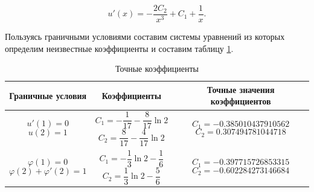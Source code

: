 \documentclass{article}
\begin{document}
\begin{displaymath}
	u'(x) = - \frac{2C_{2}}{x^3} + C_{1} + \frac{1}{x}.
\end{displaymath}

Пользуясь граничными условиями составим системы уравнений из которых определим неизвестные коэффициенты и составим таблицу \ref{table_exact_coefficients}. 

\begin{table}[!h]
\centering
\begin{tabular}{|c|c|c|}
	\hline
	Граничные условия &
	Коэффициенты & 
	Точные значения коэффициентов \\
	\hline \hline

\parbox[c]{3cm}{
	\begin{displaymath}
		u'(1) = 0
	\end{displaymath}
	\begin{displaymath}
		u(2) = 1
	\end{displaymath}
} &

\parbox[c]{3cm}{
 	\begin{displaymath}
 		C_{1} = - \frac{1}{17} - \frac{8}{17} \ln{2}
 	\end{displaymath}
	\begin{displaymath} 	
 		C_{2} = \frac{8}{17} - \frac{4}{17} \ln{2}
 	\end{displaymath}
 	} & 
 	
\parbox[c]{4.07cm}{
 	\begin{displaymath}
 		C_{1} = -0.385010437910562 
 	\end{displaymath}
 	\begin{displaymath}
 		C_{2} = 0.307494781044718
 	\end{displaymath}
 	}\\	\hline
	
\parbox[c]{3cm}{
	\begin{displaymath}
		\varphi(1) = 0
	\end{displaymath}
	\begin{displaymath}
		\varphi(2) + \varphi'(2) = 1
	\end{displaymath}
	} &

\parbox[c]{3cm}{
 	\begin{displaymath}
 		C_{1} = - \frac{1}{3} \ln{2} - \frac{1}{6} 
 	\end{displaymath}
	\begin{displaymath} 	
 		C_{2} = \frac{1}{3} \ln{2} - \frac{5}{6}
 	\end{displaymath}
 	} & 
 	
\parbox[c]{4.07cm}{
 	\begin{displaymath}
 		C_{1} = -0.397715726853315
 	\end{displaymath}
 	\begin{displaymath}
 		C_{2} = -0.602284273146684
 	\end{displaymath}
 	}\\	\hline
\end{tabular}
\caption{Точные коэффициенты}
\label{table_exact_coefficients}
\end{table}
\end{document}
